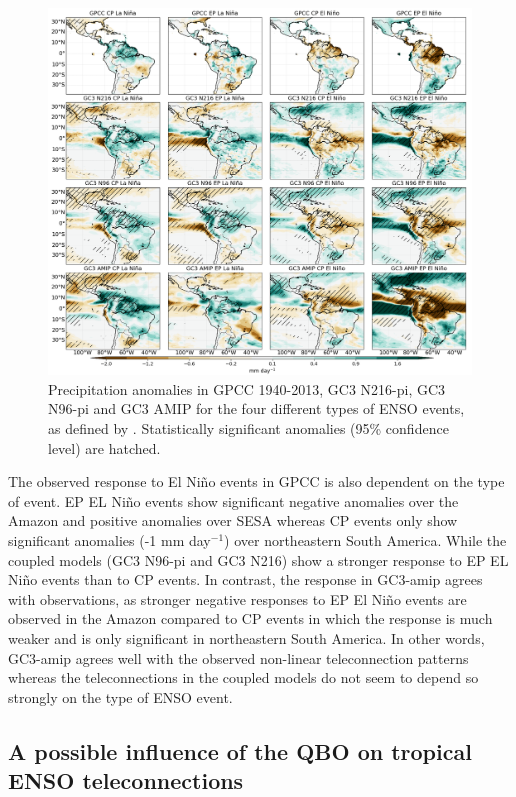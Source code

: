 \begin{figure}[t!]
\includegraphics[width=\linewidth]{figures/cppranomalies_ff}
\caption[Precipitation anomalies to different ENSO flavours]{Precipitation anomalies in GPCC 1940-2013, GC3 N216-pi, GC3 N96-pi and GC3 AMIP for the four different types of ENSO events, as defined by \cite{cai2020}. Statistically significant anomalies (95\% confidence level) are hatched.}
\label{fig:senso}
\end{figure}  

 The observed response to El Niño events in GPCC is also dependent on the type of event. EP EL Niño events show significant negative anomalies over the Amazon and positive anomalies over SESA whereas CP events only show significant anomalies (-1 mm day$^{-1}$) over northeastern South America. While the coupled models (GC3 N96-pi and GC3 N216) show a stronger response to EP  EL Niño events than to CP events.
  In contrast, the response in GC3-amip agrees with observations, as stronger negative responses to EP El Niño events are observed in the Amazon compared to CP events in which the response is much weaker and is only significant in northeastern South America. In other words, GC3-amip agrees well with the observed non-linear teleconnection patterns whereas the teleconnections in the coupled models do not seem to depend so strongly on the type of ENSO event.    

\subsection{A possible influence of the QBO on tropical ENSO teleconnections}

